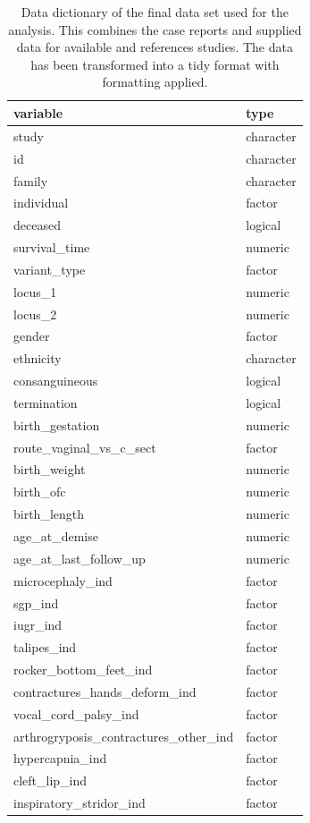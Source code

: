 \documentclass[
  letterpaper,
  DIV=11,
  numbers=noendperiod]{scrartcl}
\begin{document}
\hypertarget{tbl-dict}{}
\begin{longtable}{ll}
\caption{\label{tbl-dict}Data dictionary of the final data set used for the analysis. This
combines the case reports and supplied data for available and references
studies. The data has been transformed into a tidy format with
formatting applied. }\tabularnewline

\toprule
variable & type \\ 
\midrule
study & character \\ 
id & character \\ 
family & character \\ 
individual & factor \\ 
deceased & logical \\ 
survival\_time & numeric \\ 
variant\_type & factor \\ 
locus\_1 & numeric \\ 
locus\_2 & numeric \\ 
gender & factor \\ 
ethnicity & character \\ 
consanguineous & logical \\ 
termination & logical \\ 
birth\_gestation & numeric \\ 
route\_vaginal\_vs\_c\_sect & factor \\ 
birth\_weight & numeric \\ 
birth\_ofc & numeric \\ 
birth\_length & numeric \\ 
age\_at\_demise & numeric \\ 
age\_at\_last\_follow\_up & numeric \\ 
microcephaly\_ind & factor \\ 
sgp\_ind & factor \\ 
iugr\_ind & factor \\ 
talipes\_ind & factor \\ 
rocker\_bottom\_feet\_ind & factor \\ 
contractures\_hands\_deform\_ind & factor \\ 
vocal\_cord\_palsy\_ind & factor \\ 
arthrogryposis\_contractures\_other\_ind & factor \\ 
hypercapnia\_ind & factor \\ 
cleft\_lip\_ind & factor \\ 
inspiratory\_stridor\_ind & factor \\ 

\end{longtable}
\end{document}
